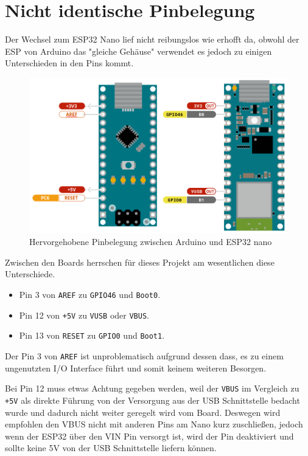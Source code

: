 \section{Nicht identische Pinbelegung}
\label{subsec:arduino_to_esp32}
Der Wechsel zum ESP32 Nano lief nicht reibungslos wie erhofft da,
obwohl der ESP von Arduino das "gleiche Gehäuse" verwendet 
es jedoch zu einigen Unterschieden in den Pins kommt. 

\begin{figure}[H]
    \includegraphics[width=\textwidth, center]{img/nano-differences-m.png}
    \caption{Hervorgehobene Pinbelegung zwischen Arduino und ESP32 nano}
    \label{fig:nano_boards}
\end{figure}

Zwischen den Boards herrschen für dieses Projekt am wesentlichen diese Unterschiede.
\begin{itemize}
    \centering
    \item Pin 3 von \texttt{AREF} zu \texttt{GPIO46} und \texttt{Boot0}.
    \item Pin 12 von \texttt{+5V} zu \texttt{VUSB} oder \texttt{VBUS}.
    \item Pin 13 von \texttt{RESET} zu \texttt{GPIO0} und \texttt{Boot1}.
\end{itemize}

Der Pin 3 von \texttt{AREF} ist unproblematisch aufgrund dessen dass,
es zu einem ungenutzten I/O Interface führt und somit keinem weiteren Besorgen.

Bei Pin 12 muss etwas Achtung gegeben werden, weil der \texttt{VBUS} im Vergleich zu \texttt{+5V} als
direkte Führung von der Versorgung aus der USB Schnittstelle bedacht wurde und 
dadurch nicht weiter geregelt wird vom Board. Deswegen wird empfohlen den VBUS 
nicht mit anderen Pins am Nano kurz zuschließen, jedoch wenn der ESP32 über den VIN Pin versorgt ist, 
wird der Pin deaktiviert und sollte keine 5V von der USB Schnittstelle liefern können. 

